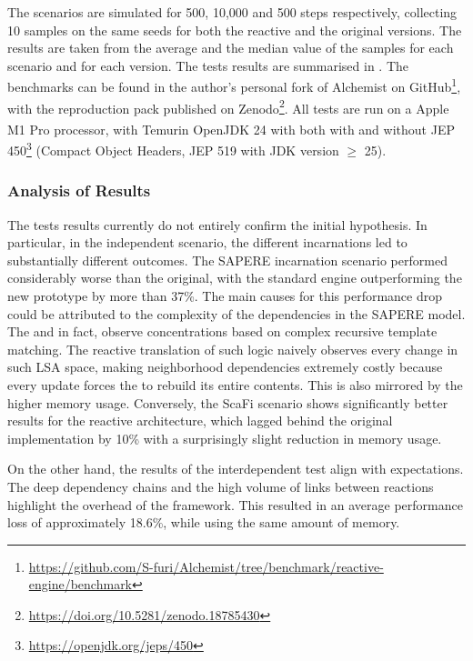 The scenarios are simulated for 500, 10,000 and 500 steps respectively,
collecting 10 samples on the same seeds for both the reactive and the original
versions. The results are taken from the average and the median value of the
samples for each scenario and for each version. The tests results are
summarised in . The benchmarks can be found in
the author's personal fork of Alchemist on
GitHub\footnote{\url{https://github.com/S-furi/Alchemist/tree/benchmark/reactive-engine/benchmark}},
with the reproduction pack published on
Zenodo\footnote{\url{https://doi.org/10.5281/zenodo.18785430}}. All tests are
run on a Apple M1 Pro processor, with
Temurin\textsuperscript{\tiny\textregistered} OpenJDK 24 with both with and
without JEP 450\footnote{\url{https://openjdk.org/jeps/450}} (Compact Object
Headers, JEP 519 with JDK version $\geq$ 25).

\subsubsection{Analysis of Results}

The tests results currently do not entirely confirm the initial hypothesis.
In particular, in the independent scenario, the different incarnations led
to substantially different outcomes. The SAPERE incarnation scenario performed
considerably worse than the original, with the standard engine outperforming
the new prototype by more than 37\%. The main causes for this performance drop
could be attributed to the complexity of the dependencies in the SAPERE model.
The  and  in fact,
observe concentrations based on complex recursive template matching. The
reactive translation of such logic naively observes every change in such LSA
space, making neighborhood dependencies extremely costly because every update
forces the  to rebuild its entire contents. This is also
mirrored by the higher memory usage. Conversely, the ScaFi scenario shows
significantly better results for the reactive architecture, which lagged behind
the original implementation by 10\% with a surprisingly slight reduction in memory
usage.

On the other hand, the results of the interdependent test align with
expectations. The deep dependency chains and the high volume of links between
reactions highlight the overhead of the framework. This resulted in an average
performance loss of approximately 18.6\%, while using the same amount of
memory.

